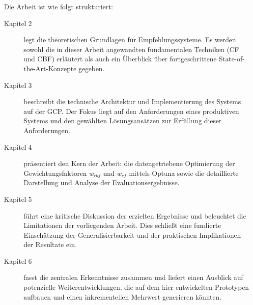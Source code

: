 Die Arbeit ist wie folgt strukturiert:
\begin{description}
    \item[Kapitel 2] legt die theoretischen Grundlagen für Empfehlungssysteme. Es werden sowohl die in dieser Arbeit angewandten fundamentalen Techniken (CF und CBF) erläutert als auch ein Überblick über fortgeschrittene State-of-the-Art-Konzepte gegeben.
    \item[Kapitel 3] beschreibt die technische Architektur und Implementierung des Systems auf der \ac{GCP}. Der Fokus liegt auf den Anforderungen eines produktiven Systems und den gewählten Lösungsansätzen zur Erfüllung dieser Anforderungen.
    \item[Kapitel 4] präsentiert den Kern der Arbeit: die datengetriebene Optimierung der Gewichtungsfaktoren \(w_{cbf}\) und \(w_{cf}\) mittels Optuna sowie die detaillierte Darstellung und Analyse der Evaluationsergebnisse.
    \item[Kapitel 5] führt eine kritische Diskussion der erzielten Ergebnisse und beleuchtet die Limitationen der vorliegenden Arbeit. Dies schließt eine fundierte Einschätzung der Generalisierbarkeit und der praktischen Implikationen der Resultate ein.
    \item[Kapitel 6] fasst die zentralen Erkenntnisse zusammen und liefert einen Ausblick auf potenzielle Weiterentwicklungen, die auf dem hier entwickelten Prototypen aufbauen und einen inkrementellen Mehrwert generieren könnten.
\end{description}